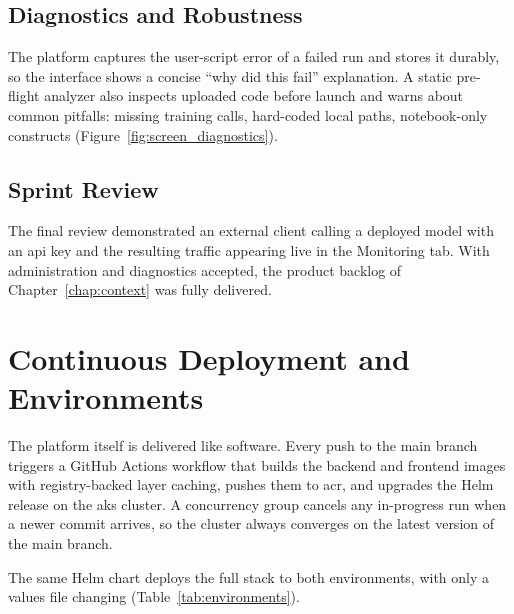 
\subsection{Diagnostics and Robustness}
The platform captures the user-script error of a failed run and stores it
durably, so the interface shows a concise ``why did this fail'' explanation. A
static pre-flight analyzer also inspects uploaded code before launch and warns
about common pitfalls: missing training calls, hard-coded local paths,
notebook-only constructs (Figure~\ref{fig:screen_diagnostics}).


\subsection{Sprint Review}
The final review demonstrated an external client calling a deployed model with
an \gls{api} key and the resulting traffic appearing live in the Monitoring
tab. With administration and diagnostics accepted, the product backlog of
Chapter~\ref{chap:context} was fully delivered.

\section{Continuous Deployment and Environments}
\label{sec:cicd}
The platform itself is delivered like software. Every push to the main branch
triggers a GitHub Actions workflow that builds the backend and frontend
images with registry-backed layer caching, pushes them to \gls{acr}, and
upgrades the Helm release on the \gls{aks} cluster. A concurrency group cancels
any in-progress run when a newer commit arrives, so the cluster always
converges on the latest version of the main branch.

The same Helm chart deploys the full stack to both environments, with only a
values file changing (Table~\ref{tab:environments}).

